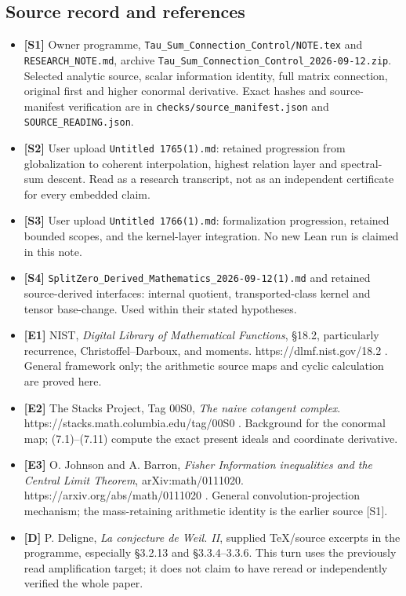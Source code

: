 \documentclass[
]{article}
\providecommand{\tightlist}{%
  \setlength{\itemsep}{0pt}\setlength{\parskip}{0pt}}
\begin{document}
\subsection{Source record and
references}\label{source-record-and-references}

\begin{itemize}
\tightlist
\item
  \textbf{{[}S1{]}} Owner programme,
  \texttt{Tau\_Sum\_Connection\_Control/NOTE.tex} and
  \texttt{RESEARCH\_NOTE.md}, archive
  \texttt{Tau\_Sum\_Connection\_Control\_2026-09-12.zip}. Selected
  analytic source, scalar information identity, full matrix connection,
  original first and higher conormal derivative. Exact hashes and
  source-manifest verification are in
  \texttt{checks/source\_manifest.json} and
  \texttt{SOURCE\_READING.json}.
\item
  \textbf{{[}S2{]}} User upload \texttt{Untitled\ 1765(1).md}: retained
  progression from globalization to coherent interpolation, highest
  relation layer and spectral-sum descent. Read as a research
  transcript, not as an independent certificate for every embedded
  claim.
\item
  \textbf{{[}S3{]}} User upload \texttt{Untitled\ 1766(1).md}:
  formalization progression, retained bounded scopes, and the
  kernel-layer integration. No new Lean run is claimed in this note.
\item
  \textbf{{[}S4{]}}
  \texttt{SplitZero\_Derived\_Mathematics\_2026-09-12(1).md} and
  retained source-derived interfaces: internal quotient,
  transported-class kernel and tensor base-change. Used within their
  stated hypotheses.
\item
  \textbf{{[}E1{]}} NIST, \emph{Digital Library of Mathematical
  Functions}, §18.2, particularly recurrence, Christoffel--Darboux, and
  moments. https://dlmf.nist.gov/18.2 . General framework only; the
  arithmetic source maps and cyclic calculation are proved here.
\item
  \textbf{{[}E2{]}} The Stacks Project, Tag 00S0, \emph{The naive
  cotangent complex}. https://stacks.math.columbia.edu/tag/00S0 .
  Background for the conormal map; (7.1)--(7.11) compute the exact
  present ideals and coordinate derivative.
\item
  \textbf{{[}E3{]}} O. Johnson and A. Barron, \emph{Fisher Information
  inequalities and the Central Limit Theorem}, arXiv:math/0111020.
  https://arxiv.org/abs/math/0111020 . General convolution-projection
  mechanism; the mass-retaining arithmetic identity is the earlier
  source {[}S1{]}.
\item
  \textbf{{[}D{]}} P. Deligne, \emph{La conjecture de Weil. II},
  supplied TeX/source excerpts in the programme, especially §3.2.13 and
  §3.3.4--3.3.6. This turn uses the previously read amplification
  target; it does not claim to have reread or independently verified the
  whole paper.
\end{itemize}
\end{document}
